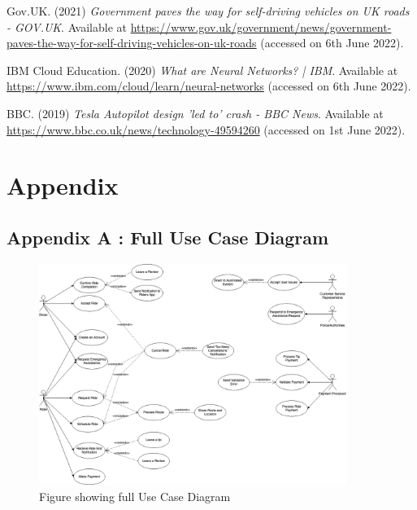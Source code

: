 \documentclass{article}
\begin{document}
    \noindent [7] Gov.UK. (2021) \textit{Government paves the way for self-driving vehicles on UK roads - GOV.UK}. Available at \url{https://www.gov.uk/government/news/government-paves-the-way-for-self-driving-vehicles-on-uk-roads} (accessed on 6th June 2022). 
    \vspace{0.2cm}

    \noindent [8] IBM Cloud Education. (2020) \textit{What are Neural Networks?  | IBM}. Available at \url{https://www.ibm.com/cloud/learn/neural-networks} (accessed on  6th June 2022).

    \noindent [9] BBC. (2019) \textit{Tesla Autopilot design 'led to' crash - BBC News}. Available at \url{https://www.bbc.co.uk/news/technology-49594260} (accessed on 1st June 2022).
    \vspace{0.2cm}

    \newpage

    \section{Appendix}
    \label{sec:AppendixA}
    \subsection{Appendix A : Full Use Case Diagram}
      \begin{figure}[H]
        \centering
        \includegraphics[width=10cm]{assets/use_cases.drawio.png}
        \caption{Figure showing full Use Case Diagram}
        \label{fig:fullUseCase}
      \end{figure}
    
    \newpage
\end{document}
